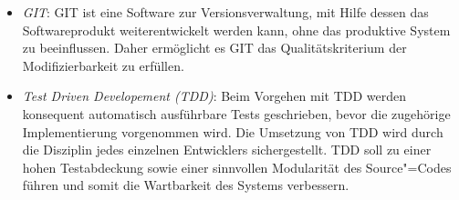 \begin{itemize}
    \item	\textit{GIT}: GIT ist eine Software zur Versionsverwaltung, mit Hilfe dessen das Softwareprodukt weiterentwickelt werden kann, ohne das produktive System zu beeinflussen. Daher ermöglicht es GIT das Qualitätskriterium der Modifizierbarkeit zu erfüllen.
    \item	\textit{Test Driven Developement (TDD)}: Beim Vorgehen mit TDD werden konsequent automatisch ausführbare Tests geschrieben, bevor die zugehörige Implementierung vorgenommen wird. Die Umsetzung von TDD wird durch die Disziplin jedes einzelnen Entwicklers sichergestellt. TDD soll zu einer hohen Testabdeckung sowie einer sinnvollen Modularität des Source"=Codes führen und somit die Wartbarkeit des Systems verbessern.
\end{itemize}
